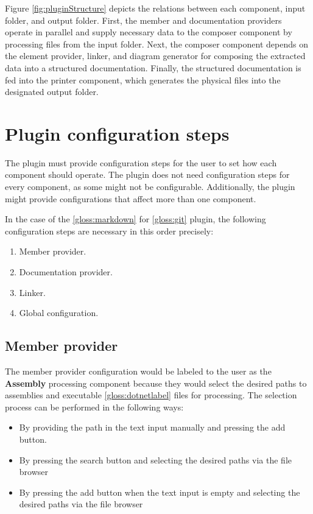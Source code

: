 Figure \ref{fig:pluginStructure} depicts the relations between each component, input folder, and output folder. First, the member and documentation providers operate in parallel and supply necessary data to the composer component by processing files from the input folder.
Next, the composer component depends on the element provider, linker, and diagram generator for composing the extracted data into a structured documentation.
Finally, the structured documentation is fed into the printer component, which generates the physical files into the designated output folder.

\section{Plugin configuration steps}

The plugin must provide configuration steps for the user to set how each component should operate. The plugin does not need configuration steps for every component, as some might not be configurable. Additionally, the plugin might provide configurations that affect more than one component.

In the case of the \ref{gloss:markdown} for \ref{gloss:git} plugin, the following configuration steps are necessary in this order precisely:
\begin{enumerate}
    \item Member provider.
    \item Documentation provider.
    \item Linker.
    \item Global configuration.
\end{enumerate}

\pagebreak
\subsection{Member provider}

The member provider configuration would be labeled to the user as the \textbf{Assembly} processing component because they would select the desired paths to assemblies and executable \ref{gloss:dotnetlabel} files for processing. The selection process can be performed in the following ways:
\begin{itemize}
    \item By providing the path in the text input manually and pressing the add button.
    \item By pressing the search button and selecting the desired paths via the file browser
    \item By pressing the add button when the text input is empty and selecting the desired paths via the file browser
\end{itemize}


